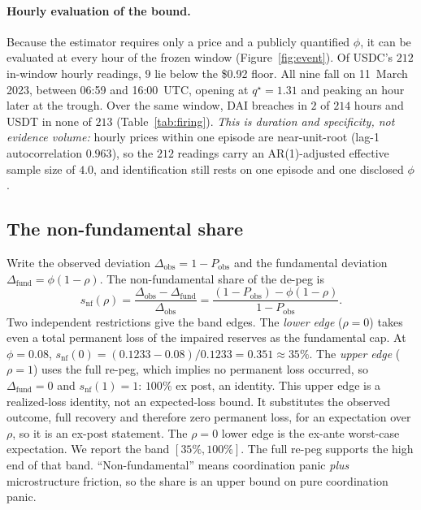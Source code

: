 \paragraph{Hourly evaluation of the bound.}
Because the estimator requires only a price and a publicly quantified $\phi$, it can be evaluated at
every hour of the frozen window (Figure~\ref{fig:event}). Of USDC's $212$ in-window
hourly readings, $9$ lie below the \$0.92 floor. All nine fall on 11~March 2023, between
06{:}59 and 16{:}00~UTC, opening at $q^\star=1.31$ and peaking an hour later at the
trough. Over the same window, DAI breaches in $2$ of $214$ hours and USDT in
none of $213$ (Table~\ref{tab:firing}).
\emph{This is duration and specificity, not evidence volume:} hourly prices within one
episode are near-unit-root (lag-1 autocorrelation $0.963$), so the $212$ readings carry an
AR(1)-adjusted effective sample size of $4.0$, and identification still rests on one
episode and one disclosed $\phi$.

\subsection{The non-fundamental share}
Write the observed deviation $\Delta_{\mathrm{obs}}=1-P_{\mathrm{obs}}$ and the fundamental
deviation $\Delta_{\mathrm{fund}}=\phi(1-\rho)$. The non-fundamental share of the de-peg is
\begin{equation}
s_{\mathrm{nf}}(\rho) = \frac{\Delta_{\mathrm{obs}}-\Delta_{\mathrm{fund}}}{\Delta_{\mathrm{obs}}}
= \frac{(1-P_{\mathrm{obs}})-\phi(1-\rho)}{1-P_{\mathrm{obs}}} .
\label{eq:share}
\end{equation}
Two independent restrictions give the band edges. The \emph{lower edge} ($\rho=0$) takes even
a total permanent loss of the impaired reserves as the fundamental cap. At $\phi=0.08$,
$s_{\mathrm{nf}}(0)=(0.1233-0.08)/0.1233=0.351\approx 35\%$. The \emph{upper edge} ($\rho=1$)
uses the full re-peg, which implies no permanent loss occurred, so $\Delta_{\mathrm{fund}}=0$
and $s_{\mathrm{nf}}(1)=1$: $100\%$ ex post, an identity. This upper edge is a realized-loss
identity, not an expected-loss bound. It substitutes the observed outcome, full recovery and
therefore zero permanent loss, for an expectation over $\rho$, so it is an ex-post statement.
The $\rho=0$ lower edge is the ex-ante worst-case expectation. We report the band
$[35\%,100\%]$. The full re-peg supports the high end of that band. ``Non-fundamental'' means
coordination panic \emph{plus} microstructure friction, so the share is an upper bound on pure
coordination panic.

